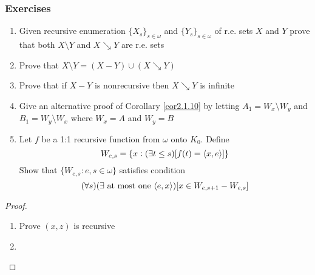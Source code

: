 \documentclass[11pt]{article}
\begin{document}
\subsubsection{Exercises}
\label{sec:org70db928}
\begin{exercise}
\label{2.2.10}
\begin{enumerate}
\item Given recursive enumeration \(\{X_s\}_{s\in\omega}\) and
\(\{Y_s\}_{s\in\omega}\) of r.e. sets \(X\) and \(Y\) prove that both
\(X\setminus Y\) and \(X\searrow Y\) are r.e. sets
\item Prove that \(X\setminus Y=(X-Y)\cup(X\searrow Y)\)
\item Prove that if \(X-Y\) is nonrecursive then \(X\searrow Y\) is infinite
\item Give an alternative proof of Corollary \ref{cor2.1.10} by letting
\(A_1=W_x\setminus W_y\) and \(B_1=W_y\setminus W_x\) where \(W_x=A\) and \(W_y=B\)
\item Let \(f\) be a 1:1 recursive function from \(\omega\) onto \(K_0\). Define
\begin{equation*}
W_{e,s}=\{x: (\exists t\le s)[f(t)=\langle x,e\rangle]\}
\end{equation*}
Show that \(\{W_{e,s}:e,s\in\omega\}\) satisfies condition
\begin{equation*}
(\forall s)(\exists\text{ at most one }\langle e,x\rangle)[x\in W_{e,s+1}-W_{e,s}]
\end{equation*}
\end{enumerate}
\end{exercise}

\begin{proof}
\begin{enumerate}
\item Prove \((x,z)\) is recursive
\setcounter{enumi}{2}
\item 
\end{enumerate}
\end{proof}
\end{document}
